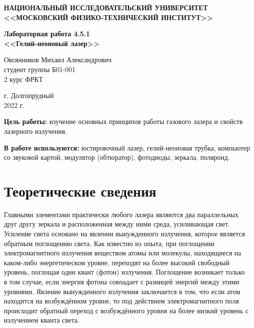 \documentclass[a4paper,12pt]{article} %
\begin{document}
	
	
	\begin{center}
		
		
		\textbf{НАЦИОНАЛЬНЫЙ ИССЛЕДОВАТЕЛЬСКИЙ УНИВЕРСИТЕТ \\ <<МОСКОВСКИЙ ФИЗИКО-ТЕХНИЧЕСКИЙ ИНСТИТУТ>>}
		\vspace{13ex}
		
		\textbf{Лабораторная работа 4.5.1\\ <<Гелий-неоновый лазер>>}
		\vspace{40ex}
		
		\normalsize{Овсянников Михаил Александрович \\ студент группы Б01-001\\ 2 курс ФРКТ\\}
	\end{center}
	
	\vfill 
	
	\begin{center}
		г. Долгопрудный\\ 
		2022 г.
	\end{center}
	
	
	\thispagestyle{empty} %
	\newpage
	
	
	\textbf{Цель работы:} изучение основных принципов работы газового лазера и свойств лазерного излучения.
	
	
	\textbf{В работе используются:} юстировочный лазер, гелий-неоновая трубка, компьютер со звуковой картой, модулятор (обтюратор), фотодиоды, зеркала, поляроид.
	
	\section*{Теоретические сведения}
	
	Главными элементами практически любого лазера являются два параллельных друг другу зеркала и расположенная между ними среда, усиливающая свет. Усиление света основано на явлении вынужденного излучения, которое является обратным поглощению света. Как известно из опыта, при поглощении электромагнитного излучения веществом атомы или молекулы, находящиеся на каком-либо энергетическом уровне, переходят на более высокий свободный уровень, поглощая один квант (фотон) излучения. Поглощение возникает только в том случае, если энергия фотона совпадает с разницей энергий между этими уровнями. Явление вынужденного излучения заключается в том, что если атом находится на возбуждённом уровне, то под действием электромагнитного поля происходит обратный переход с возбуждённого уровня на более низкий уровень с излучением кванта света.
	
\end{document}
